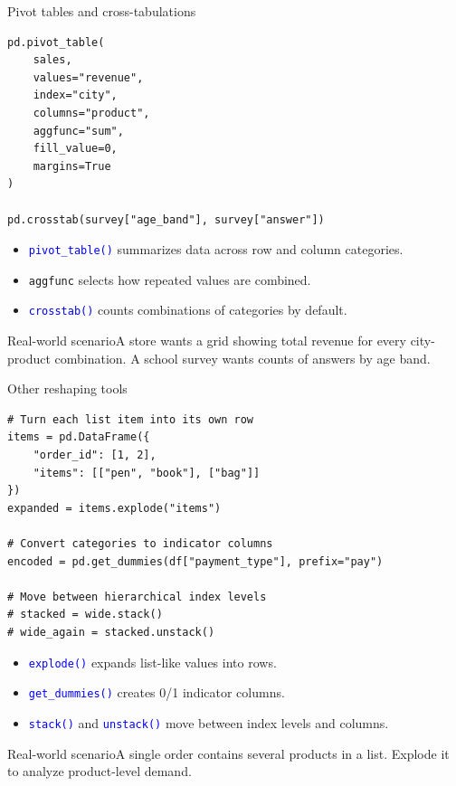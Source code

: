 \documentclass[aspectratio=169,10pt]{beamer}
\newcommand{\scenario}[1]{\begin{block}{Real-world scenario}#1\end{block}}
\newcommand{\method}[1]{\texttt{\textcolor{Blue}{#1}}}
\begin{document}
\begin{frame}[fragile]{Pivot tables and cross-tabulations}
\begin{lstlisting}
pd.pivot_table(
    sales,
    values="revenue",
    index="city",
    columns="product",
    aggfunc="sum",
    fill_value=0,
    margins=True
)

pd.crosstab(survey["age_band"], survey["answer"])
\end{lstlisting}
\begin{itemize}
\item \method{pivot\_table()} summarizes data across row and column categories.
\item \texttt{aggfunc} selects how repeated values are combined.
\item \method{crosstab()} counts combinations of categories by default.
\end{itemize}
\scenario{A store wants a grid showing total revenue for every city-product combination. A school survey wants counts of answers by age band.}
\end{frame}

\begin{frame}[fragile]{Other reshaping tools}
\begin{lstlisting}
# Turn each list item into its own row
items = pd.DataFrame({
    "order_id": [1, 2],
    "items": [["pen", "book"], ["bag"]]
})
expanded = items.explode("items")

# Convert categories to indicator columns
encoded = pd.get_dummies(df["payment_type"], prefix="pay")

# Move between hierarchical index levels
# stacked = wide.stack()
# wide_again = stacked.unstack()
\end{lstlisting}
\begin{itemize}
\item \method{explode()} expands list-like values into rows.
\item \method{get\_dummies()} creates 0/1 indicator columns.
\item \method{stack()} and \method{unstack()} move between index levels and columns.
\end{itemize}
\scenario{A single order contains several products in a list. Explode it to analyze product-level demand.}
\end{frame}
\end{document}
